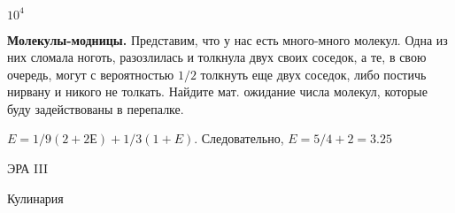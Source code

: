 \documentclass[12pt, addpoints]{exam} %
\begin{document}
\begin{questions}
\begin{solution}
$10^4 $
\end{solution}


\question \textbf{Молекулы-модницы.} Представим, что у нас есть много-много молекул. Одна из них сломала ноготь, разозлилась и толкнула двух своих соседок, а те, в свою очередь, могут с вероятностью $1/2$ толкнуть еще двух соседок, либо постичь нирвану и никого не толкать. Найдите мат. ожидание числа молекул, которые буду задействованы в перепалке.

\begin{solution}
$E = 1/9(2 + 2Е) + 1/3(1 + E)$. Следовательно, $E = 5/4 + 2 = 3.25$
\end{solution}


\end{questions}


\newpage
\begin{center}
ЭРА III
\end{center}

\begin{center}
Кулинария
\end{center}
\end{document}
